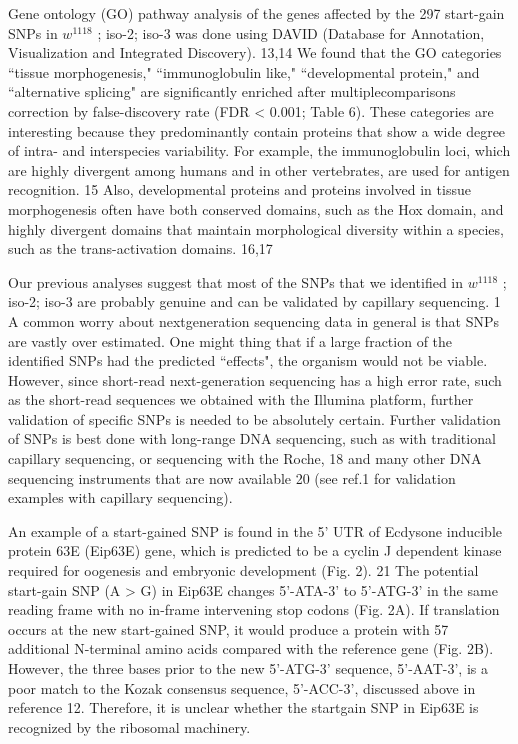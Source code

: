 Gene ontology (GO) pathway analysis of the genes affected by the 297 start-gain SNPs in $w^{1118}$ ; iso-2; iso-3 was done using DAVID (Database for Annotation, Visualization and Integrated Discovery). 13,14 We found that the GO categories ``tissue morphogenesis," ``immunoglobulin like," ``developmental protein," and ``alternative splicing" are significantly enriched after multiplecomparisons correction by false-discovery rate (FDR < 0.001; Table 6). These categories are interesting because they predominantly contain proteins that show a wide degree of intra- and interspecies variability. For example, the immunoglobulin loci, which are highly divergent among humans and in other vertebrates, are used for antigen recognition. 15 Also, developmental proteins and proteins involved in tissue morphogenesis often have both conserved domains, such as the Hox domain, and highly divergent domains that maintain morphological diversity within a species, such as the trans-activation domains. 16,17

Our previous analyses suggest that most of the SNPs that we identified in $w^{1118}$ ; iso-2; iso-3 are probably genuine and can be validated by capillary sequencing. 1 A common worry about nextgeneration sequencing data in general is that SNPs are vastly over estimated. One might thing that if a large fraction of the identified SNPs had the predicted ``effects", the organism would not be viable. However, since short-read next-generation sequencing has a high error rate, such as the short-read sequences we obtained with the Illumina platform, further validation of specific SNPs is needed to be absolutely certain. Further validation of SNPs is best done with long-range DNA sequencing, such as with traditional capillary sequencing, or sequencing with the Roche, 18 and many other DNA sequencing instruments that are now available 20 (see ref.1 for validation examples with capillary sequencing).

An example of a start-gained SNP is found in the 5' UTR of Ecdysone inducible protein 63E (Eip63E) gene, which is predicted to be a cyclin J dependent kinase required for oogenesis and embryonic development (Fig. 2). 21 The potential start-gain SNP (A > G) in Eip63E changes 5'-ATA-3' to 5'-ATG-3' in the same reading frame with no in-frame intervening stop codons (Fig.  2A). If translation occurs at the new start-gained SNP, it would produce a protein with 57 additional N-terminal amino acids compared with the reference gene (Fig. 2B). However, the three bases prior to the new 5'-ATG-3' sequence, 5'-AAT-3', is a poor match to the Kozak consensus sequence, 5'-ACC-3', discussed above in reference 12. Therefore, it is unclear whether the startgain SNP in Eip63E is recognized by the ribosomal machinery.

